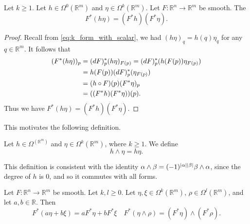 \documentclass[notoc,notitlepage]{tufte-book}
\begin{document}
\begin{lemma}\label{lemma:linearity_of_the_pullback_over_the_0_form_that_is_a_scalar}
  Let $k \geq 1$. Let $h \in \Omega^0(\mathbb{R}^m)$ and $\eta \in
  \Omega^k(\mathbb{R}^m)$. Let $F : \mathbb{R}^n \to \mathbb{R}^m$ be smooth. The
  \begin{equation*}
    F^* (h \eta) = (F^* h)(F^* \eta).
  \end{equation*}
\end{lemma}

\begin{proof}
  Recall from \cref{eq:k_form_with_scalar}, we had $(h \eta)_q = h(q) \eta_q$ for any $q
  \in \mathbb{R}^m$. It follows that
  \begin{align*}
    (F^* (h\eta))_p &= (\mathop{}\!d{F})_p^*(h\eta)_{F(p)} = (\mathop{}\!d{F})_p^*(h(F(p))\eta_{F(p)}) \\
                    &= h(F(p)) (\mathop{}\!d{F})_p^* (\eta_{F(p)}) \\
                    &= (h \circ F)(p) (F^* \eta)_p \\
                    &= ((F^* h)(F^* \eta))(p).
  \end{align*}
  Thus we have $F^* (h \eta) = (F^* h)(F^* \eta)$.
\end{proof}

This motivates the following definition.

\begin{defn}\label{defn:wedge_product_of_a_0_form_and_k_form}
  Let $h \in \Omega^(\mathbb{R}^m)$ and $\eta \in \Omega^k(\mathbb{R}^m)$, where $k \geq
  1$. We define
  \begin{equation*}
    h \land \eta = h \eta.
  \end{equation*}
\end{defn}

\begin{note}
  This definition is consistent with the identity $\alpha \land \beta = (-1)^{\left|\alpha\right|
  \left|\beta\right|} \beta \land \alpha$, since the degree of $h$ is $0$, and so it commutes
  with all forms.
\end{note}

\begin{crly}\label{crly:general_linearity_of_the_pullback}
  Let $F : \mathbb{R}^n \to \mathbb{R}^m$ be smooth. Let $k, l \geq 0$. Let $\eta, \xi \in
  \Omega^k(\mathbb{R}^m)$, $\rho \in \Omega^l(\mathbb{R}^m)$, and let $a, b \in
  \mathbb{R}$. Then
  \begin{equation*}
    F^* (a \eta + b \xi) = a F^* \eta + b F^* \xi \quad F^* (\eta \land \rho) = (F^* \eta)
    \land (F^* \rho).
  \end{equation*}
\end{crly}
\end{document}
